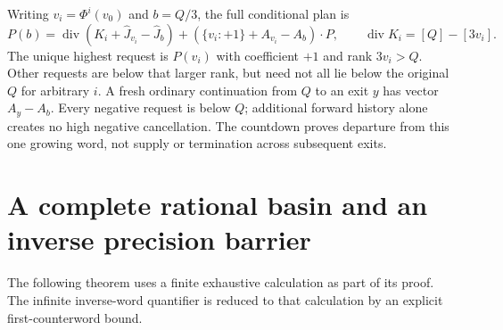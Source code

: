 \documentclass[11pt]{article}
\begin{document}
Writing $v_i=\Phi^i(v_0)$ and $b=Q/3$, the full conditional plan is
\[
 P(b)=\operatorname{div}(K_i+\widehat J_{v_i}-\widehat J_b)
       +(\{v_i:+1\}+A_{v_i}-A_b)\cdot P,
 \qquad \operatorname{div}K_i=[Q]-[3v_i].
\]
The unique highest request is $P(v_i)$ with coefficient $+1$ and
rank $3v_i>Q$. Other requests are below that larger rank, but need not
all lie below the original $Q$ for arbitrary $i$.
A fresh ordinary continuation from $Q$ to an exit $y$ has vector $A_y-A_b$.
Every negative request is below $Q$; additional forward history alone
creates no high negative cancellation. The countdown proves departure
from this one growing word, not supply or termination across subsequent exits.

\section{A complete rational basin and an inverse precision barrier}

The following theorem uses a finite exhaustive calculation as part of its
proof. The infinite inverse-word quantifier is reduced to that calculation
by an explicit first-counterword bound.
\end{document}
